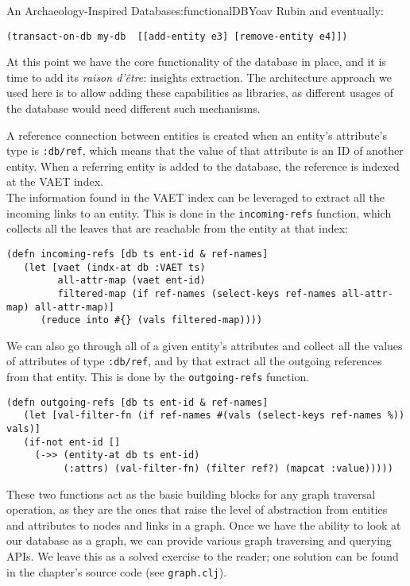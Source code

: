 \begin{aosachapter}{An Archaeology-Inspired Database}{s:functionalDB}{Yoav Rubin}
and eventually:

\begin{verbatim}
(transact-on-db my-db  [[add-entity e3] [remove-entity e4]])
\end{verbatim}

\label{insight-extraction-as-libraries}

At this point we have the core functionality of the database in place,
and it is time to add its \emph{raison d'être}: insights extraction. The
architecture approach we used here is to allow adding these capabilities
as libraries, as different usages of the database would need different
such mechanisms.

\label{graph-traversal}

A reference connection between entities is created when an entity's
attribute's type is \texttt{:db/ref}, which means that the value of that
attribute is an ID of another entity. When a referring entity is added
to the database, the reference is indexed at the VAET index.\\The
information found in the VAET index can be leveraged to extract all the
incoming links to an entity. This is done in the \texttt{incoming-refs}
function, which collects all the leaves that are reachable from the
entity at that index:

\begin{verbatim}
(defn incoming-refs [db ts ent-id & ref-names]
   (let [vaet (indx-at db :VAET ts)
         all-attr-map (vaet ent-id)
         filtered-map (if ref-names (select-keys ref-names all-attr-map) all-attr-map)]
      (reduce into #{} (vals filtered-map))))
\end{verbatim}

We can also go through all of a given entity's attributes and collect
all the values of attributes of type \texttt{:db/ref}, and by that
extract all the outgoing references from that entity. This is done by
the \texttt{outgoing-refs} function.

\begin{verbatim}
(defn outgoing-refs [db ts ent-id & ref-names]
   (let [val-filter-fn (if ref-names #(vals (select-keys ref-names %)) vals)]
   (if-not ent-id []
     (->> (entity-at db ts ent-id)
          (:attrs) (val-filter-fn) (filter ref?) (mapcat :value)))))
\end{verbatim}

These two functions act as the basic building blocks for any graph
traversal operation, as they are the ones that raise the level of
abstraction from entities and attributes to nodes and links in a graph.
Once we have the ability to look at our database as a graph, we can
provide various graph traversing and querying APIs. We leave this as a
solved exercise to the reader; one solution can be found in the
chapter's source code (see \texttt{graph.clj}).


\end{aosachapter}
